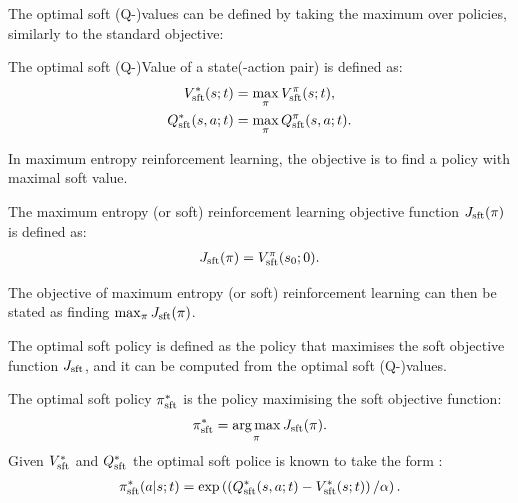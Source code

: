         The optimal soft (Q-)values can be defined by taking the maximum over policies, similarly to the standard objective:
        \begin{defn}
            \label{def:2:optimal_sft_value}
            \label{def:2:optimal_sft_q_value}
            The \textnormal{optimal soft (Q-)Value} of a state(-action pair) is defined as:
            \begin{align}
                V_{{\textnormal{sft}}}^*(s;t) &= \max_{\pi} V_{{\textnormal{sft}}}^{\pi}(s;t), \label{eq:2:opt_soft_value_fn_def} \\
                Q_{{\textnormal{sft}}}^*(s,a;t) &= \max_{\pi} Q_{{\textnormal{sft}}}^{\pi}(s,a;t). \label{eq:2:opt_soft_q_value_fn_def}
            \end{align}
        \end{defn}

        In maximum entropy reinforcement learning, the objective is to find a policy with maximal soft value.
        \begin{defn}
            \label{def:2:soft_rl_obj_fn}
            The \textnormal{maximum entropy (or soft) reinforcement learning objective function} $J_{{\textnormal{sft}}}(\pi)$ is defined as:
            \begin{align}
                J_{{\textnormal{sft}}}(\pi) = V_{{\textnormal{sft}}}^{\pi}(s_0;0). \label{eq:2:soft_rl_obj_fn_def}
            \end{align}

            The objective of maximum entropy (or soft) reinforcement learning can then be stated as finding $\max_{\pi} J_{{\textnormal{sft}}}(\pi)$.
        \end{defn}

        The optimal soft policy is defined as the policy that maximises the soft objective function $J_{{\textnormal{sft}}}$, and it can be computed from the optimal soft (Q-)values.
        \begin{defn}
            \label{def:2:opt_sft_policy}
            The \textnormal{optimal soft policy} $\pi_{{\textnormal{sft}}}^*$ is the policy maximising the soft objective function:
            \begin{align}
                \pi_{{\textnormal{sft}}}^* = \operatorname*{arg\,max}_\pi J_{{\textnormal{sft}}}(\pi). \label{eq:2:opt_sft_policy_def}
            \end{align}
            Given $V_{{\textnormal{sft}}}^*$ and $Q_{{\textnormal{sft}}}^*$ the optimal soft police is known to take the form \cite{deep_energy_policies}:
            \begin{align}
                \pi_{{\textnormal{sft}}}^*(a|s;t) = \exp\left(\left(Q_{{\textnormal{sft}}}^*(s,a;t) - V_{{\textnormal{sft}}}^*(s;t)\right) / \alpha \right). \label{eq:2:opt_sft_policy_from_opt_value_fns}
            \end{align}
        \end{defn}

